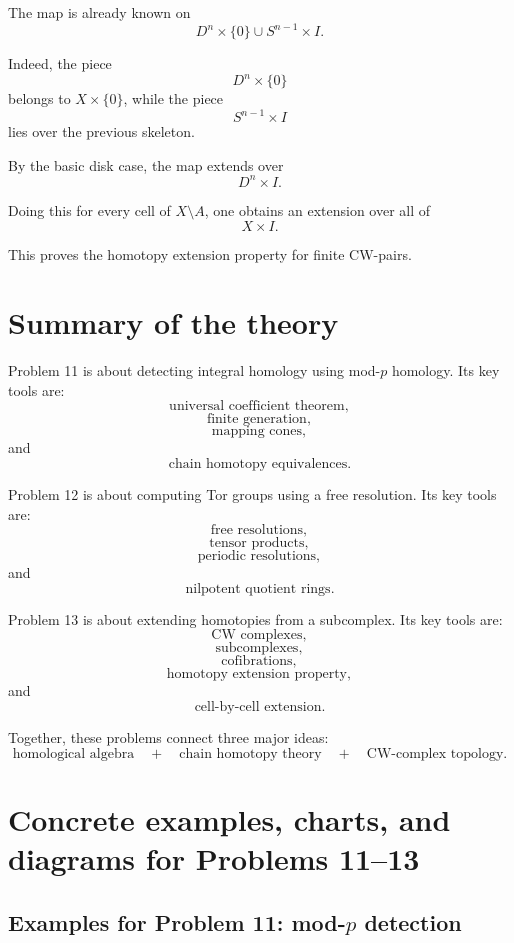 \documentclass[12pt,a4paper]{article}
\theoremstyle{notespace}
\begin{document}
The map is already known on
\[
D^n\times\{0\}\cup S^{n-1}\times I.
\]

Indeed, the piece
\[
D^n\times\{0\}
\]
belongs to \(X\times\{0\}\), while the piece
\[
S^{n-1}\times I
\]
lies over the previous skeleton.

By the basic disk case, the map extends over
\[
D^n\times I.
\]

Doing this for every cell of \(X\setminus A\), one obtains an extension over all of
\[
X\times I.
\]

This proves the homotopy extension property for finite CW-pairs.

\section{Summary of the theory}

Problem 11 is about detecting integral homology using mod-\(p\) homology. Its key tools are:
\[
\text{universal coefficient theorem},
\]
\[
\text{finite generation},
\]
\[
\text{mapping cones},
\]
and
\[
\text{chain homotopy equivalences}.
\]

Problem 12 is about computing Tor groups using a free resolution. Its key tools are:
\[
\text{free resolutions},
\]
\[
\text{tensor products},
\]
\[
\text{periodic resolutions},
\]
and
\[
\text{nilpotent quotient rings}.
\]

Problem 13 is about extending homotopies from a subcomplex. Its key tools are:
\[
\text{CW complexes},
\]
\[
\text{subcomplexes},
\]
\[
\text{cofibrations},
\]
\[
\text{homotopy extension property},
\]
and
\[
\text{cell-by-cell extension}.
\]

Together, these problems connect three major ideas:
\[
\boxed{
	\text{homological algebra}
	\quad+\quad
	\text{chain homotopy theory}
	\quad+\quad
	\text{CW-complex topology}.
}
\]


\section*{Concrete examples, charts, and diagrams for Problems 11--13}

\subsection*{Examples for Problem 11: mod-\(p\) detection}
\end{document}
